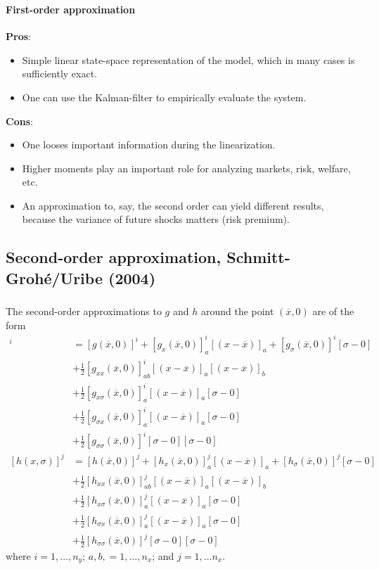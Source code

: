 \documentclass[handout]{beamer}  %
\begin{document}
\begin{frame}
\frametitle{\secname}\framesubtitle{First-order approximation}
\textbf{Pros}:
\begin{itemize}
   \item Simple linear state-space representation of the model, which in many cases is sufficiently exact.
   \item One can use the Kalman-filter to empirically evaluate the system.
\end{itemize}
\textbf{Cons}:
\begin{itemize}
   \item One looses important information during the linearization.
   \item Higher moments play an important role for analyzing markets, risk, welfare, etc.
   \item An approximation to, say, the second order can yield different results, because the variance of future shocks matters (risk premium).
\end{itemize}

\end{frame}

\subsection{Second-order approximation, Schmitt-Groh\'{e}/Uribe (2004)}
\begin{frame}
\frametitle{\secname}\framesubtitle{\subsecname}\footnotesize
The second-order approximations to $g$ and $h$ around the point $(\overline{x},0)$ are of the form
\begin{align*}
  [g(x,\sigma)]^i &= [g(\overline{x},0)]^i + [g_x(\overline{x},0)]^i_a [(x-\overline{x})]_a + [g_\sigma(\overline{x},0)]^i [\sigma-0]\\
  & + \frac{1}{2} [g_{xx}(\overline{x},0)]^i_{ab} [(x-\overline{x})]_a [(x-\overline{x})]_b\\
  & + \frac{1}{2} [g_{x\sigma}(\overline{x},0)]^i_{a} [(x-\overline{x})]_a [\sigma-0]\\
  & + \frac{1}{2} [g_{\sigma x}(\overline{x},0)]^i_{a} [(x-\overline{x})]_a [\sigma-0]\\
  & + \frac{1}{2} [g_{\sigma\sigma}(\overline{x},0)]^i [\sigma-0][\sigma-0]\\
  [h(x,\sigma)]^j &= [h(\overline{x},0)]^j + [h_x(\overline{x},0)]^j_a [(x-\overline{x})]_a + [h_\sigma(\overline{x},0)]^j [\sigma-0]\\
  & + \frac{1}{2} [h_{xx}(\overline{x},0)]^j_{ab} [(x-\overline{x})]_a [(x-\overline{x})]_b\\
  & + \frac{1}{2} [h_{x\sigma}(\overline{x},0)]^j_{a} [(x-\overline{x})]_a [\sigma-0]\\
  & + \frac{1}{2} [h_{\sigma x}(\overline{x},0)]^j_{a} [(x-\overline{x})]_a [\sigma-0]\\
  & + \frac{1}{2} [h_{\sigma\sigma}(\overline{x},0)]^j [\sigma-0][\sigma-0]
\end{align*}
where $i=1,\dots,n_y$; $a,b, = 1,\dots,n_x$; and $j=1,\dots n_x$.
\end{frame}
\end{document}
